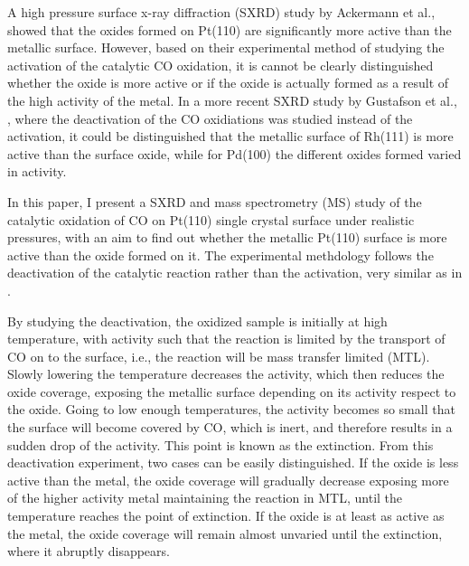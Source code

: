 \documentclass[aps,prl,groupedaddress,twocolumn]{revtex4-1}
\begin{document}
A high pressure surface x-ray diffraction (SXRD) study by Ackermann et al.,\cite{Ackermann} showed that the oxides formed on Pt(110) are significantly more active than the metallic surface. However, based on their experimental method of studying the activation of the catalytic CO oxidation, it is cannot be clearly distinguished whether the oxide is more active or if the oxide is actually formed as a result of the high activity of the metal. In a more recent SXRD study by Gustafson et al., \cite{Gustafson}, where the deactivation of the CO oxidiations was studied instead of the activation, it could be distinguished that the metallic surface of Rh(111) is more active than the surface oxide, while for Pd(100) the different oxides formed varied in activity.

In this paper, I present a SXRD and mass spectrometry (MS) study of the catalytic oxidation of CO on Pt(110) single crystal surface under realistic pressures, with an aim to find out whether the metallic Pt(110) surface is more active than the oxide formed on it. The experimental methdology follows the deactivation of the catalytic reaction rather than the activation, very similar as in \cite{Gustafson}. 

By studying the deactivation, the oxidized sample is initially at high temperature, with activity such that the reaction is limited by the transport of CO on to the surface, i.e., the reaction will be mass transfer limited (MTL). Slowly lowering the temperature decreases the activity, which then reduces the oxide coverage, exposing the metallic surface depending on its activity respect to the oxide. Going to low enough temperatures, the activity becomes so small that the surface will become covered by CO, which is inert, and therefore results in a sudden drop of the activity. This point is known as the extinction. From this deactivation experiment, two cases can be easily distinguished. If the oxide is less active than the metal, the oxide coverage will gradually decrease exposing more of the higher activity metal maintaining the reaction in MTL, until the temperature reaches the point of extinction. If the oxide is at least as active as the metal, the oxide coverage will remain almost unvaried until the extinction, where it abruptly disappears.






\end{document}
